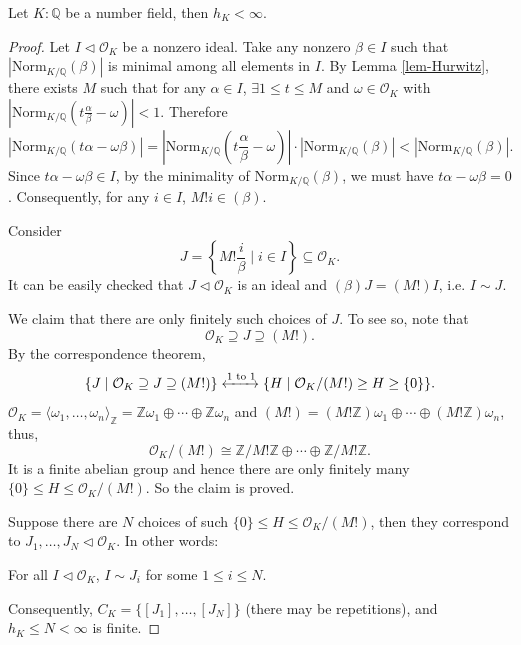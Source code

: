 \begin{theorem}
    Let $K:\mathbb{Q}$ be a number field, then $h_{K}<\infty$. 
\end{theorem}

\begin{proof}
    Let $I\lhd \mathcal{O}_{K}$ be a nonzero ideal. Take any nonzero $\beta\in I$ such that $\left| \mathrm{Norm}_{K/\mathbb{Q}}(\beta) \right| $ is minimal among all elements in $I$. By Lemma \ref{lem-Hurwitz}, there exists $M$ such that for any $\alpha\in I$, $\exists 1\leq t\leq M$ and $\omega\in \mathcal{O}_{K}$ with $\left| \mathrm{Norm}_{K /\mathbb{Q}}(t\frac{\alpha}{\beta}-\omega) \right| <1$. Therefore 
    \[
    \left| \mathrm{Norm}_{K /\mathbb{Q}}(t\alpha-\omega\beta) \right|=\left| \mathrm{Norm}_{K /\mathbb{Q}}(t\frac{\alpha}{\beta}-\omega) \right|\cdot \left|\mathrm{Norm}_{K /\mathbb{Q}}(\beta)\right|<\left| \mathrm{Norm}_{K /\mathbb{Q}}(\beta) \right| .
    \] 
    Since $t\alpha-\omega\beta\in I$, by the minimality of $\mathrm{Norm}_{K /\mathbb{Q}}(\beta)$, we must have $t\alpha-\omega\beta=0$. Consequently, for any $i\in I$, $M!i\in (\beta)$. 

    \medskip
    Consider $$J=\left\{M!\frac{i}{\beta} \mid i\in I\right\}\subseteq \mathcal{O}_{K}.$$ It can be easily checked that $J\lhd \mathcal{O}_{K}$ is an ideal and $(\beta)J=(M!)I$, i.e. $I\sim J$. 

    \medskip
    We claim that there are only finitely such choices of $J$. To see so, note that 
    $$\mathcal{O}_{K}\supseteq J\supseteq (M!).$$ 
    By the correspondence theorem, 
        \[
        \{J \mid \mathcal{O}_{K}\supseteq J\supseteq (M!)\}\xleftrightarrow{1 \text{ to } 1} \{H \mid \mathcal{O}_{K} /(M!) \geq H\geq \{0\}\}.
        \]
        $\mathcal{O}_{K}=\langle \omega_{1},\dots, \omega_{n}\rangle_{\mathbb{Z}}=\mathbb{Z}\omega_{1}\oplus \cdots\oplus\mathbb{Z}\omega_{n}$ and $(M!)=(M!\mathbb{Z})\omega_{1}\oplus \cdots\oplus(M!\mathbb{Z})\omega_{n}$, thus, 
        \[
        \mathcal{O}_{K} /(M!)\cong \mathbb{Z}/M!\mathbb{Z}\oplus\cdots\oplus \mathbb{Z} /M!\mathbb{Z}.
        \]
        It is a finite abelian group and hence there are only finitely many $\{0\}\leq H\leq \mathcal{O}_{K} /(M!)$. So the claim is proved.

    \medskip
    Suppose there are $N$ choices of such $\{0\}\leq H\leq \mathcal{O}_{K} /(M!)$, then they correspond to
    $J_{1},\dots, J_{N} \lhd \mathcal{O}_K$. In other words:
    \begin{center}
        For all $I \lhd \mathcal{O}_K$, $I \sim J_i$ for some $1 \leq i \leq N$. 
    \end{center}
    Consequently, $C_{K}=\{[J_{1}],\dots, [J_{N}]\}$ (there may be repetitions), and $h_{K}\leq N <\infty$ is finite. 
\end{proof}

